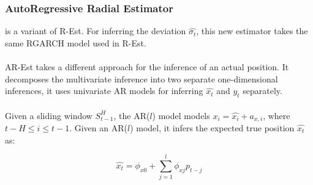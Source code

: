
\begin{frame}
\frametitle{AutoRegressive Radial Estimator}

 is a variant of R-Est. For inferring the deviation $\hat{\sigma_t}$, this new estimator takes the same RGARCH model used in R-Est.\\~\\

AR-Est takes a different approach for the inference of an actual position. It decomposes the multivariate inference into two separate one-dimensional inferences, it uses univariate AR models for inferring $\hat{x_t}$ and $\hat{y_t}$ separately.\\~\\

Given a sliding window $S^{H}_{t-1}$, the AR($l$) model models $x_i = \hat{x_i} + a_{x,i}$, where $t-H \leq i \leq t-1$. Given an AR($l$) model, it infers the expected true position $\hat{x_t}$ as:~\cite{shumway2010time}

\begin{equation}
  \hat{x_t} = \phi_{x0} + \sum_{j=1}^{l}\phi_{xj}p_{t-j}
\end{equation}

\end{frame}
